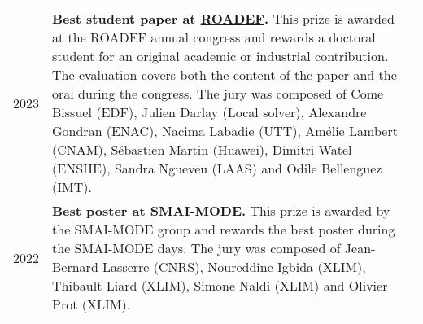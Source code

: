 \begin{longtable}[l]{@{}p{}p{}}
    2023 & \textbf{Best student paper at \href{https://roadef.org}{ROADEF}.} This prize is awarded at the ROADEF annual congress and rewards a doctoral student for an original academic or industrial contribution. The evaluation covers both the content of the paper and the oral during the congress. The jury was composed of Come Bissuel (EDF), Julien Darlay (Local solver), Alexandre Gondran (ENAC), Nacima Labadie (UTT), Amélie Lambert (CNAM), Sébastien Martin (Huawei), Dimitri Watel (ENSIIE), Sandra Ngueveu (LAAS) and Odile Bellenguez (IMT). \\
    2022 & \textbf{Best poster at \href{http://smai.emath.fr/}{SMAI-MODE}.} This prize is awarded by the SMAI-MODE group and rewards the best poster during the SMAI-MODE days. The jury was composed of Jean-Bernard Lasserre (CNRS), Noureddine Igbida (XLIM), Thibault Liard (XLIM), Simone Naldi (XLIM) and Olivier Prot (XLIM). \\
\end{longtable}
